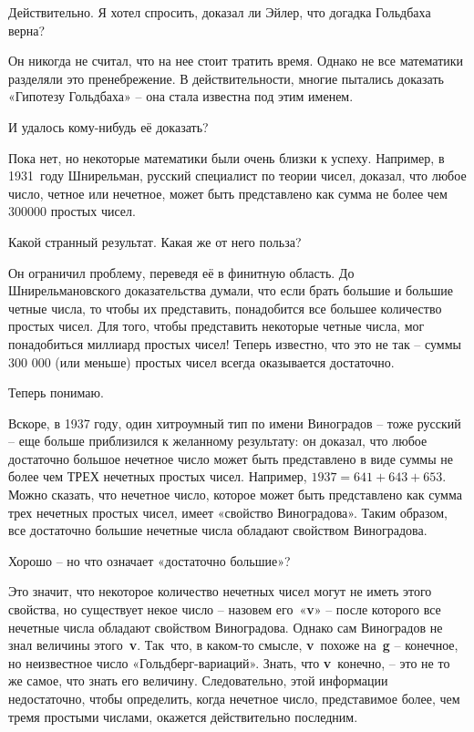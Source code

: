 \documentclass[../main.tex]{subfiles}
\begin{document}
\begin{dialogue}
 Действительно. Я хотел спросить, доказал ли Эйлер, что догадка Гольдбаха верна?

 Он никогда не считал, что на нее стоит тратить время. Однако не все математики разделяли это пренебрежение. В действительности, многие пытались доказать «Гипотезу Гольдбаха» \--- она стала известна под этим именем.

 И удалось кому-нибудь её доказать?

 Пока нет, но некоторые математики были очень близки к успеху. Например, в 1931~году Шнирельман, русский специалист по теории чисел, доказал, что любое число, четное или нечетное, может быть представлено как сумма не более чем \num{300 000} простых чисел.

 Какой странный результат. Какая же от него польза?

 Он ограничил проблему, переведя её в финитную область. До Шнирельмановского доказательства думали, что если брать большие и большие четные числа, то чтобы их представить, понадобится все большее количество простых чисел. Для того, чтобы представить некоторые четные числа, мог понадобиться миллиард простых чисел! Теперь известно, что это не так \--- суммы 300 000 (или меньше) простых чисел всегда оказывается достаточно.

 Теперь понимаю.

 Вскоре, в 1937 году, один хитроумный тип по имени Виноградов \--- тоже русский \--- еще больше приблизился к желанному результату: он доказал, что любое достаточно большое нечетное число может быть представлено в виде суммы не более чем ТРЕХ нечетных простых чисел. Например, $1937 = 641 + 643 + 653$. Можно сказать, что нечетное число, которое может быть представлено как сумма трех нечетных простых чисел, имеет «свойство Виноградова». Таким образом, все достаточно большие нечетные числа обладают свойством Виноградова.

 Хорошо \--- но что означает «достаточно большие»?

 Это значит, что некоторое количество нечетных чисел могут не иметь этого свойства, но существует некое число \--- назовем его~«\textbf{v}» \--- после которого все нечетные числа обладают свойством Виноградова. Однако сам Виноградов не знал величины этого~\textbf{v}. Так~что, в каком-то смысле, \textbf{v}~похоже на~\textbf{g} \--- конечное, но неизвестное число «Гольдберг-вариаций». Знать, что \textbf{v}~конечно, \--- это не то же самое, что знать его величину. Следовательно, этой информации недостаточно, чтобы определить, когда нечетное число, представимое более, чем тремя простыми числами, окажется действительно последним.


\end{dialogue}
\end{document}
